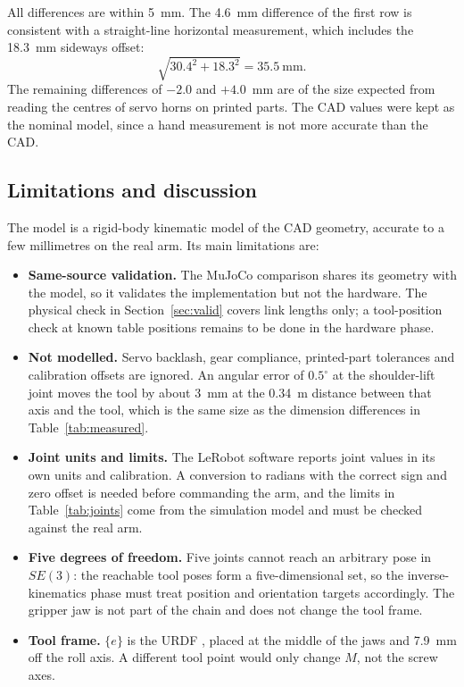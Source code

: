 \documentclass[11pt,a4paper]{article}
\newcommand{\code}[1]{\path{#1}}          %
\begin{document}
All differences are within 5~mm. The 4.6~mm difference of the first row is consistent with a straight-line horizontal measurement, which includes the 18.3~mm sideways offset:
\[ \sqrt{30.4^2+18.3^2}=35.5\ \text{mm}. \]
The remaining differences of $-2.0$ and $+4.0$~mm are of the size expected from reading the centres of servo horns on printed parts. The CAD values were kept as the nominal model, since a hand measurement is not more accurate than the CAD.

\subsection{Limitations and discussion}

The model is a rigid-body kinematic model of the CAD geometry, accurate to a few millimetres on the real arm. Its main limitations are:
\begin{itemize}
  \item \textbf{Same-source validation.} The MuJoCo comparison shares its geometry with the model, so it validates the implementation but not the hardware. The physical check in Section~\ref{sec:valid} covers link lengths only; a tool-position check at known table positions remains to be done in the hardware phase.
  \item \textbf{Not modelled.} Servo backlash, gear compliance, printed-part tolerances and calibration offsets are ignored. An angular error of $0.5^\circ$ at the shoulder-lift joint moves the tool by about 3~mm at the 0.34~m distance between that axis and the tool, which is the same size as the dimension differences in Table~\ref{tab:measured}.
  \item \textbf{Joint units and limits.} The LeRobot software reports joint values in its own units and calibration. A conversion to radians with the correct sign and zero offset is needed before commanding the arm, and the limits in Table~\ref{tab:joints} come from the simulation model and must be checked against the real arm.
  \item \textbf{Five degrees of freedom.} Five joints cannot reach an arbitrary pose in $SE(3)$: the reachable tool poses form a five-dimensional set, so the inverse-kinematics phase must treat position and orientation targets accordingly. The gripper jaw is not part of the chain and does not change the tool frame.
  \item \textbf{Tool frame.} $\{e\}$ is the URDF \code{gripper_frame_link}, placed at the middle of the jaws and 7.9~mm off the roll axis. A different tool point would only change $M$, not the screw axes.
\end{itemize}
\end{document}
